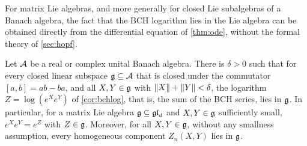 For matrix Lie algebras, and more generally for closed Lie subalgebras of a
Banach algebra, the fact that the BCH logarithm lies in the Lie algebra can
be obtained directly from the differential equation of \cref{thm:ode},
without the formal theory of \cref{sec:hopf}.
\begin{proposition}\label{prop:closedlie}
Let $\mathcal{A}$ be a real or complex unital Banach algebra. There is $\delta>0$
such that for every closed linear subspace $\mathfrak{g}\subseteq\mathcal{A}$ that is closed
under the commutator $[a,b]=ab-ba$, and all $X,Y\in\mathfrak{g}$ with
$\left\lVert X\right\rVert+\left\lVert Y\right\rVert<\delta$, the logarithm $Z=\log(e^Xe^Y)$ of
\cref{cor:bchlog}, that is, the sum of the BCH series, lies in $\mathfrak{g}$. In
particular, for a matrix Lie algebra $\mathfrak{g}\subseteq\mathfrak{gl}_d$ and $X,Y\in\mathfrak{g}$
sufficiently small, $e^Xe^Y=e^Z$ with $Z\in\mathfrak{g}$. Moreover, for all
$X,Y\in\mathfrak{g}$, without any smallness assumption, every homogeneous component
$Z_n(X,Y)$ lies in $\mathfrak{g}$.
\end{proposition}
